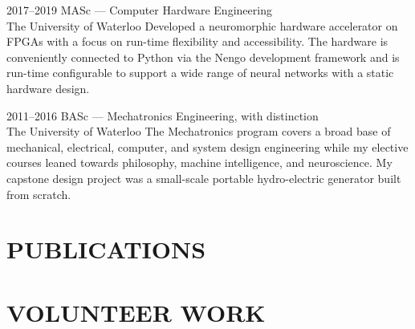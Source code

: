 \documentclass[a4paper,nocolors]{cv-friggeri-ben}
\begin{document}
\begin{entrylist}

\entry
    {2017--2019}
    {MASc {\normalfont --- Computer Hardware Engineering}}
    {\\The University of Waterloo}
    {Developed a neuromorphic hardware accelerator on FPGAs with a focus on
    run-time flexibility and accessibility. The hardware is conveniently
    connected to Python via the Nengo development framework and is run-time
    configurable to support a wide range of neural networks with a static
    hardware design.}

\entry
    {2011--2016}
    {BASc {\normalfont --- Mechatronics Engineering, with distinction}}
    {\\The University of Waterloo}
    {The Mechatronics program covers a broad base of mechanical, electrical,
    computer, and system design engineering while my elective courses leaned
    towards philosophy, machine intelligence, and neuroscience. My capstone
    design project was a small-scale portable hydro-electric generator built
    from scratch.}

\end{entrylist}



\section{PUBLICATIONS}

\printallbibsections



\section{VOLUNTEER WORK}
\end{document}
